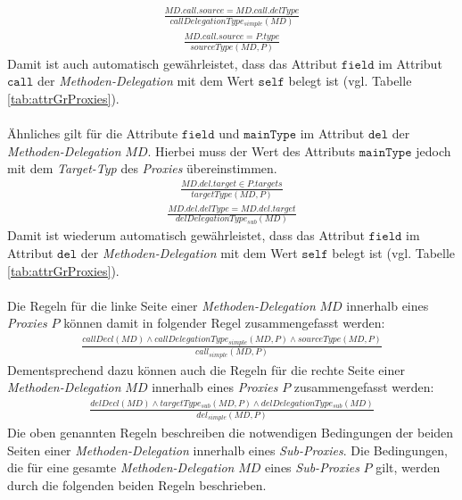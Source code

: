\begin{gather*}
\frac{\mathit{MD.call.source} = \mathit{MD.call.delType}}
{\mathit{callDelegationType_{simple}(MD)}}
\end{gather*}
\begin{gather*}
\frac{\mathit{MD.call.source} = \mathit{P.type}}
{\mathit{sourceType(MD, P)}}
\end{gather*}
\noindent
Damit ist auch automatisch gewährleistet, dass das Attribut $\texttt{field}$ im Attribut $\texttt{call}$ der \emph{Methoden-Delegation} mit dem Wert $\texttt{self}$ belegt ist (vgl. Tabelle \ref{tab:attrGrProxies}).
\\\\
Ähnliches gilt für die Attribute $\texttt{field}$ und $\texttt{mainType}$ im Attribut $\texttt{del}$ der \emph{Methoden-Delegation} $\mathit{MD}$. Hierbei muss der Wert des Attributs $\texttt{mainType}$ jedoch mit dem \emph{Target-Typ} des \emph{Proxies} übereinstimmen.
\begin{gather*}
\frac{\mathit{MD.del.target} \in \mathit{P.targets} }
{\mathit{targetType(MD, P)}}
\end{gather*}
\begin{gather*}
\frac{\mathit{MD.del.delType} = \mathit{MD.del.target} }
{\mathit{delDelegationType_{sub}(MD)}}
\end{gather*}
Damit ist wiederum automatisch gewährleistet, dass das Attribut $\texttt{field}$ im Attribut $\texttt{del}$ der \emph{Methoden-Delegation} mit dem Wert $\texttt{self}$ belegt ist (vgl. Tabelle \ref{tab:attrGrProxies}).
\\\\
Die Regeln für die linke Seite einer \emph{Methoden-Delegation} $\mathit{MD}$ innerhalb eines \emph{Proxies} $P$ können damit in folgender Regel zusammengefasst werden:
\begin{gather*}
\frac{\mathit{callDecl(MD)} \wedge \mathit{callDelegationType_{simple}(MD,P)} \wedge \mathit{sourceType(MD,P)}}
{\mathit{call_{simple}(MD,P)}}
\end{gather*}
Dementsprechend dazu können auch die Regeln für die rechte Seite einer \emph{Methoden-Delegation} $\mathit{MD}$ innerhalb eines \emph{Proxies} $P$ zusammengefasst werden:
\begin{gather*}
\frac{\mathit{delDecl(MD)} \wedge \mathit{targetType_{sub}(MD,P) \wedge \mathit{delDelegationType_{sub}(MD)}}}
{\mathit{del_{simple}(MD,P)}}
\end{gather*}
\noindent
Die oben genannten Regeln beschreiben die notwendigen Bedingungen der beiden Seiten einer \emph{Methoden-Delegation} innerhalb eines \emph{Sub-Proxies}. Die Bedingungen, die für eine gesamte \emph{Methoden-Delegation} $\mathit{MD}$ eines \emph{Sub-Proxies} $P$ gilt, werden durch die folgenden beiden Regeln beschrieben.
